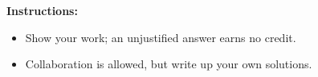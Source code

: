 
\textbf{Instructions:}

\begin{itemize}
    \small
    \item Show your work; an unjustified answer earns no credit.

    \item Collaboration is allowed, but write up your own solutions.
\end{itemize}
